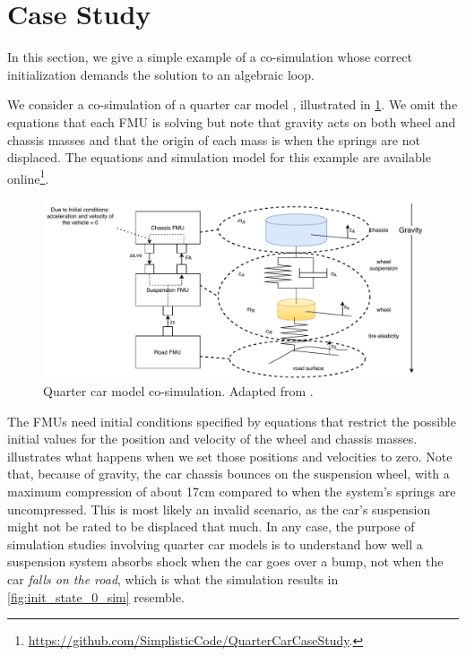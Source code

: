 \section{Case Study}
\label{sec:case_study}
In this section, we give a simple example of a co-simulation whose correct initialization demands the solution to an algebraic loop.

We consider a co-simulation of a quarter car model \cite[Section 6.4]{Schramm2014}, illustrated in \cref{fig:quarter_car}.
We omit the equations that each FMU is solving but note that gravity acts on both wheel and chassis masses and that the origin of each mass is when the springs are not displaced.
The equations and simulation model for this example are available online\footnote{\url{https://github.com/SimplisticCode/QuarterCarCaseStudy}.}. 

\begin{figure}[htb]
    \centering
    \includegraphics[width=1\textwidth]{images/quarter_car_FMUs.pdf}
    \caption{Quarter car model co-simulation. Adapted from \cite[Section 6.4]{Schramm2014}.}
    \label{fig:quarter_car}
\end{figure}

The FMUs need initial conditions specified by equations that restrict the possible initial values for the position and velocity of the wheel and chassis masses.
 illustrates what happens when we set those positions and velocities to zero.
Note that, because of gravity, the car chassis bounces on the suspension wheel, with a maximum compression of about 17cm compared to when the system's springs are uncompressed. This is most likely an invalid scenario, as the car's suspension might not be rated to be displaced that much. In any case, the purpose of simulation studies involving quarter car models is to understand how well a suspension system absorbs shock when the car goes over a bump, not when the car \emph{falls on the road}, which is what the simulation results in \cref{fig:init_state_0_sim} resemble.

